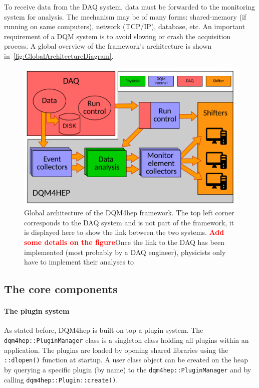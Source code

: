 \documentclass{webofc}
\begin{document}
To receive data from the DAQ system, data must be forwarded to the monitoring system for analysis.
The mechanism may be of many forms: shared-memory (if running on same computers), network (TCP/IP), database, etc.
An important requirement of a DQM system is to avoid slowing or crash the acquisition process.
A global overview of the framework's architecture is shown in~\autoref{fig:GlobalArchitectureDiagram}.

\begin{figure}
  \centering
  \includegraphics[width=.95\textwidth]{figs/AnalysisModuleArchitecture.pdf}
  \caption{Global architecture of the DQM4hep framework. The top left corner corresponds to the DAQ system and is not part of the framework, it is displayed here to show the link between the two systems. \textcolor{red}{\textbf{Add some details on the figure}}Once the link to the DAQ has been implemented (most probably by a DAQ engineer), physicists only have to implement their analyses to }
  \label{fig:GlobalArchitectureDiagram}
\end{figure}

\subsection{The core components}
\label{subsec:core}

\paragraph{The plugin system}

As stated before, DQM4hep is built on top a plugin system. 
The \texttt{dqm4hep::PluginManager} class is a singleton class holding all plugins within an application. 
The plugins are loaded by opening shared libraries using the \texttt{::dlopen()} function at startup. 
A user class object can be created on the heap by querying a specific plugin (by name) to the \texttt{dqm4hep::PluginManager} and 
by calling \texttt{dqm4hep::Plugin::create()}.
\end{document}
